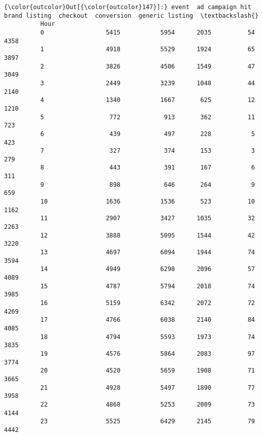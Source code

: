 \documentclass[11pt]{article}
\begin{document}
\begin{Verbatim}[commandchars=\\\{\}]
{\color{outcolor}Out[{\color{outcolor}147}]:} event  ad campaign hit  brand listing  checkout  conversion  generic listing  \textbackslash{}
          Hour                                                                           
          0                 5415           5954      2035          54             4358   
          1                 4918           5529      1924          65             3897   
          2                 3826           4506      1549          47             3049   
          3                 2449           3239      1048          44             2140   
          4                 1340           1667       625          12             1210   
          5                  772            913       362          11              723   
          6                  439            497       228           5              423   
          7                  327            374       153           3              279   
          8                  443            391       167           6              311   
          9                  898            646       264           9              659   
          10                1636           1536       523          10             1162   
          11                2907           3427      1035          32             2263   
          12                3888           5095      1544          42             3220   
          13                4697           6094      1944          74             3594   
          14                4949           6298      2096          57             4089   
          15                4787           5794      2018          74             3985   
          16                5159           6342      2072          72             4269   
          17                4766           6038      2140          84             4085   
          18                4794           5593      1973          74             3835   
          19                4576           5864      2083          97             3774   
          20                4520           5659      1908          71             3665   
          21                4928           5497      1890          77             3958   
          22                4868           5253      2009          73             4144   
          23                5525           6429      2145          79             4442   
          

\end{Verbatim}
\end{document}
